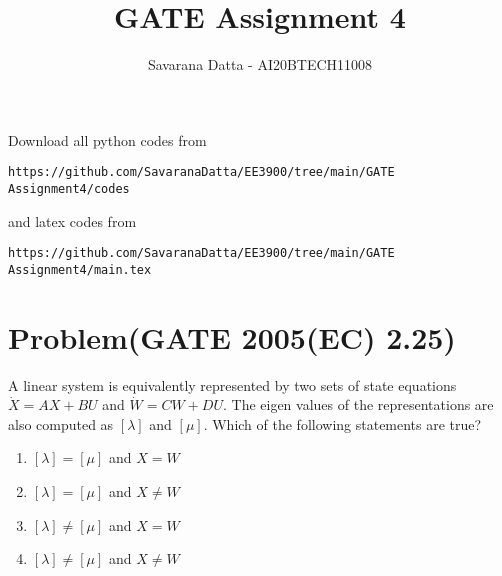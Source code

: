 \documentclass[journal,12pt,twocolumn]{IEEEtran}
\begin{document}
     \def\rightbox#1{\makebox[0in][r]{#1}}
     \def\centbox#1{\makebox[0in]{#1}}
     \def\topbox#1{\raisebox{-\baselineskip}[0in][0in]{#1}}
     \def\midbox#1{\raisebox{-0.5\baselineskip}[0in][0in]{#1}}
\vspace{3cm}
\title{ GATE Assignment 4}
\author{Savarana Datta - AI20BTECH11008}
\maketitle
\newpage
\bigskip
\renewcommand{\thefigure}{\theenumi}
\renewcommand{\thetable}{\theenumi}
Download all python codes from 
\begin{lstlisting}
https://github.com/SavaranaDatta/EE3900/tree/main/GATE Assignment4/codes
\end{lstlisting}
%
and latex codes from 
%
\begin{lstlisting}
https://github.com/SavaranaDatta/EE3900/tree/main/GATE Assignment4/main.tex
\end{lstlisting}

\section{Problem(GATE 2005(EC) 2.25)}
A linear system is equivalently represented by two sets of state equations $\dot{X}=AX+BU$ and $\dot{W}=CW+DU$. The eigen values of the representations are also computed as $[\lambda]$ and $[\mu]$. Which of the following statements are true?
\begin{enumerate}
    \item $[\lambda]=[\mu]$ and $X=W$
    \item $[\lambda]=[\mu]$ and $X\neq W$
    \item $[\lambda]\neq[\mu]$ and $X=W$
    \item $[\lambda]\neq[\mu]$ and $X\neq W$
\end{enumerate}
\end{document}
